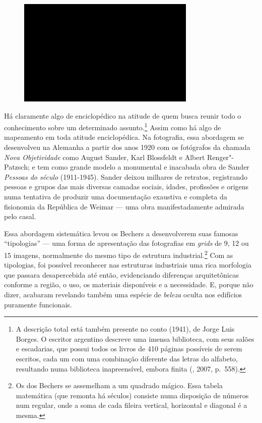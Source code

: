 \begin{figure}[!ht]

\centering
 \includegraphics[width=85mm]{./imgs/im1.jpg}
\caption{\tiny{}}

\end{figure}


Há claramente algo de enciclopédico na atitude de quem busca reunir todo
o conhecimento sobre um determinado assunto.\footnote{A descrição total
  está também presente no conto {} (1941), de
  Jorge Luis Borges. O escritor argentino descreve uma imensa
  biblioteca, com seus salões e escadarias, que possui todos os livros
  de 410 páginas possíveis de serem escritos, cada um com uma combinação
  diferente das letras do alfabeto, resultando numa biblioteca
  inapreensível, embora finita (, 2007, p.~558).} Assim como há
algo de mapeamento em toda atitude enciclopédica. Na fotografia, essa
abordagem se desenvolveu na Alemanha a partir dos anos 1920 com os
fotógrafos da chamada \emph{Nova Objetividade} como August Sander, Karl
Blossfeldt e Albert Renger"-Patzsch; e tem como grande modelo a
monumental e inacabada obra de Sander \emph{Pessoas do século }
(1911-1945). Sander deixou milhares de retratos, registrando pessoas e
grupos das mais diversas camadas sociais, idades, profissões e origens
numa tentativa de produzir uma documentação exaustiva e completa da
fisionomia da República de Weimar --- uma obra manifestadamente admirada
pelo casal.

Essa abordagem sistemática levou os Bechers a desenvolverem suas famosas
``tipologias'' --- uma forma de apresentação das fotografias em
\emph{grids} de 9, 12 ou 15 imagens, normalmente do mesmo tipo de
estrutura industrial.\footnote{Os {} dos Bechers se assemelham a um quadrado mágico. Essa tabela matemática (que remonta há séculos) consiste numa disposição de números num {} regular, onde a soma de cada fileira vertical, horizontal e diagonal é a mesma.} Com as tipologias, foi possível reconhecer nas
estruturas industriais uma rica morfologia que passara desapercebida até
então, evidenciando diferenças arquitetônicas conforme a região, o uso,
os materiais disponíveis e a necessidade. E, porque não dizer, acabaram
revelando também uma espécie de \emph{beleza} oculta nos edifícios
puramente funcionais.

